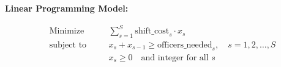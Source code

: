 \documentclass{article}
\begin{document}
\textbf{Linear Programming Model:}

\[
\begin{aligned}
& \text{Minimize} \quad && \sum_{s=1}^{S} \text{shift\_cost}_s \cdot x_s \\
& \text{subject to} \quad && x_s + x_{s-1} \geq \text{officers\_needed}_s, \quad s = 1, 2, \ldots, S \\
& && x_s \geq 0 \quad \text{and integer for all } s
\end{aligned}
\]
\end{document}
